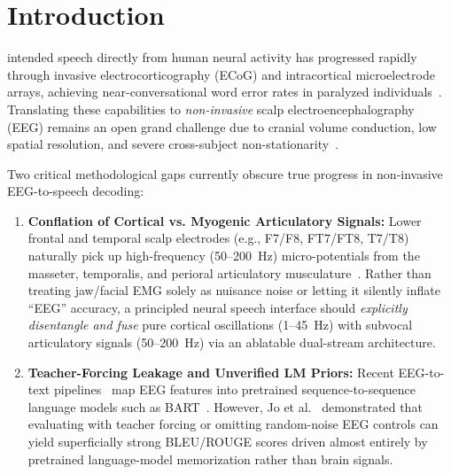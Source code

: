 \documentclass[journal]{IEEEtran}
\begin{document}
\section{Introduction}
 intended speech directly from human neural activity has progressed rapidly through invasive electrocorticography (ECoG) and intracortical microelectrode arrays, achieving near-conversational word error rates in paralyzed individuals~\cite{willett2023high}. Translating these capabilities to \emph{non-invasive} scalp electroencephalography (EEG) remains an open grand challenge due to cranial volume conduction, low spatial resolution, and severe cross-subject non-stationarity~\cite{defossez2023decoding}.

Two critical methodological gaps currently obscure true progress in non-invasive EEG-to-speech decoding:
\begin{enumerate}
    \item \textbf{Conflation of Cortical vs. Myogenic Articulatory Signals:} Lower frontal and temporal scalp electrodes (e.g., F7/F8, FT7/FT8, T7/T8) naturally pick up high-frequency (50--200~Hz) micro-potentials from the masseter, temporalis, and perioral articulatory musculature~\cite{kapur2018alterego}. Rather than treating jaw/facial EMG solely as nuisance noise or letting it silently inflate ``EEG'' accuracy, a principled neural speech interface should \emph{explicitly disentangle and fuse} pure cortical oscillations (1--45~Hz) with subvocal articulatory signals (50--200~Hz) via an ablatable dual-stream architecture.
    \item \textbf{Teacher-Forcing Leakage and Unverified LM Priors:} Recent EEG-to-text pipelines~\cite{wang2022open,duan2023dewave} map EEG features into pretrained sequence-to-sequence language models such as BART~\cite{lewis2020bart}. However, Jo et al.~\cite{jo2024are} demonstrated that evaluating with teacher forcing or omitting random-noise EEG controls can yield superficially strong BLEU/ROUGE scores driven almost entirely by pretrained language-model memorization rather than brain signals.
\end{enumerate}
\end{document}
